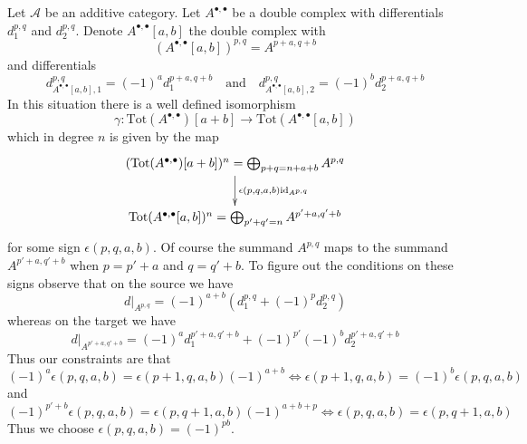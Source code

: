 \begin{remark}
\label{remark-shift-double-complex}
Let $\mathcal{A}$ be an additive category. Let $A^{\bullet, \bullet}$
be a double complex with differentials $d_1^{p, q}$ and $d_2^{p, q}$.
Denote $A^{\bullet, \bullet}[a, b]$ the double complex with
$$
(A^{\bullet, \bullet}[a, b])^{p, q} = A^{p + a, q + b}
$$
and differentials
$$
d_{A^{\bullet, \bullet}[a, b], 1}^{p, q} = (-1)^a d_1^{p + a, q + b}
\quad\text{and}\quad
d_{A^{\bullet, \bullet}[a, b], 2}^{p, q} = (-1)^b d_2^{p + a, q + b}
$$
In this situation there is a well defined isomorphism
$$
\gamma :
\text{Tot}(A^{\bullet, \bullet})[a + b]
\longrightarrow
\text{Tot}(A^{\bullet, \bullet}[a, b])
$$
which in degree $n$ is given by the map
$$
\xymatrix{
(\text{Tot}(A^{\bullet, \bullet})[a + b])^n =
\bigoplus_{p + q = n + a + b} A^{p, q}
\ar[d]^{\epsilon(p, q, a, b)\text{id}_{A^{p, q}}} \\
\text{Tot}(A^{\bullet, \bullet}[a, b])^n =
\bigoplus_{p' + q' = n} A^{p' + a, q' + b}
}
$$
for some sign $\epsilon(p, q, a, b)$. Of course the summand $A^{p, q}$
maps to the summand $A^{p' + a, q' + b}$ when $p = p' + a$ and $q = q' + b$.
To figure out the conditions on these signs observe that on the source we have
$$
d|_{A^{p, q}} = (-1)^{a + b}\left(d_1^{p, q} + (-1)^pd_2^{p, q}\right)
$$
whereas on the target we have
$$
d|_{A^{p' + a, q' + b}} =
(-1)^ad_1^{p' + a, q' + b} + (-1)^{p'}(-1)^bd_2^{p' + a, q' + b}
$$
Thus our constraints are that
$$
(-1)^a \epsilon(p, q, a, b) = \epsilon(p + 1, q, a, b)(-1)^{a + b}
\Leftrightarrow
\epsilon(p + 1, q, a, b) = (-1)^b \epsilon(p, q, a, b)
$$
and
$$
(-1)^{p' + b}\epsilon(p, q, a, b) =
\epsilon(p, q + 1, a, b) (-1)^{a + b + p}
\Leftrightarrow
\epsilon(p, q, a, b) = \epsilon(p, q + 1, a, b)
$$
Thus we choose $\epsilon(p, q, a, b) = (-1)^{pb}$.
\end{remark}

